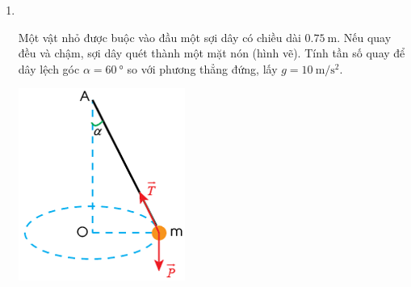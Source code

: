 \begin{enumerate}[label=\bfseries Câu \arabic*:]
\item {}\\
{Một vật nhỏ được buộc vào đầu một sợi dây có chiều dài $\SI{0.75}{\meter}$. Nếu quay đều và chậm, sợi dây quét thành một mặt nón (hình vẽ). Tính tần số quay để dây lệch góc $\alpha=\SI{60}{\degree}$ so với phương thẳng đứng, lấy $g=\SI{10}{\meter/\second^2}$.
\begin{center}
	\includegraphics[width=0.25\linewidth]{../figs/VN10-2023-PH-TP032-P-2}
\end{center}
}
\end{enumerate}